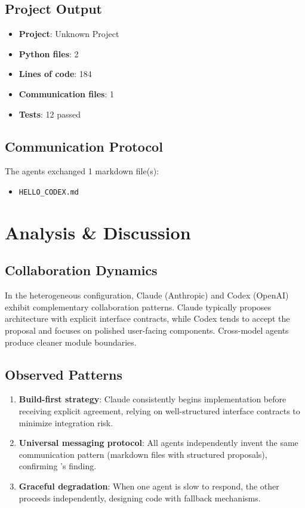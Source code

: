 \documentclass[11pt,a4paper]{article}
\begin{document}
\subsection{Project Output}

\begin{itemize}
  \item \textbf{Project}: Unknown Project
  \item \textbf{Python files}: 2
  \item \textbf{Lines of code}: 184
  \item \textbf{Communication files}: 1
  \item \textbf{Tests}: 12 passed
\end{itemize}

\subsection{Communication Protocol}

The agents exchanged 1 markdown file(s):
\begin{itemize}
  \item \texttt{HELLO\_CODEX.md}
\end{itemize}

\section{Analysis \& Discussion}

\subsection{Collaboration Dynamics}

In the heterogeneous configuration, Claude (Anthropic) and Codex (OpenAI) exhibit complementary collaboration patterns. Claude typically proposes architecture with explicit interface contracts, while Codex tends to accept the proposal and focuses on polished user-facing components. Cross-model agents produce cleaner module boundaries.

\subsection{Observed Patterns}

\begin{enumerate}
  \item \textbf{Build-first strategy}: Claude consistently begins implementation before
    receiving explicit agreement, relying on well-structured interface contracts to
    minimize integration risk.
  \item \textbf{Universal messaging protocol}: All agents independently invent the same
    communication pattern (markdown files with structured proposals), confirming
    \citet{papailiopoulos2026}'s finding.
  \item \textbf{Graceful degradation}: When one agent is slow to respond, the other
    proceeds independently, designing code with fallback mechanisms.
\end{enumerate}
\end{document}
